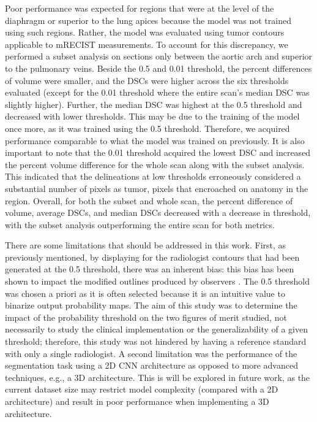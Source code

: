 \documentclass{article}
\begin{document}
Poor performance was expected for regions that were at the level of the diaphragm or superior to the lung apices because the model was not trained using such regions. Rather, the model was evaluated using tumor contours applicable to mRECIST measurements. To account for this discrepancy, we performed a subset analysis on sections only between the aortic arch and superior to the pulmonary veins. Beside the 0.5 and 0.01 threshold, the percent differences of volume were smaller, and the DSCs were higher across the six thresholds evaluated (except for the 0.01 threshold where the entire scan’s median DSC was slightly higher). Further, the median DSC was highest at the 0.5 threshold and decreased with lower thresholds. This may be due to the training of the model once more, as it was trained using the 0.5 threshold. Therefore, we acquired performance comparable to what the model was trained on previously. It is also important to note that the 0.01 threshold acquired the lowest DSC and increased the percent volume difference for the whole scan along with the subset analysis. This indicated that the delineations at low thresholds erroneously considered a substantial number of pixels as tumor, pixels that encroached on anatomy in the region. Overall, for both the subset and whole scan, the percent difference of volume, average DSCs, and median DSCs decreased with a decrease in threshold, with the subset analysis outperforming the entire scan for both metrics. 

There are some limitations that should be addressed in this work. First, as previously mentioned, by displaying for the radiologist contours that had been generated at the 0.5 threshold, there was an inherent bias: this bias has been shown to impact the modified outlines produced by observers \cite{Sensakovic}. The 0.5 threshold was chosen a priori as it is often selected because it is an intuitive value to binarize output probability maps. The aim of this study was to determine the impact of the probability threshold on the two figures of merit studied, not necessarily to study the clinical implementation or the generalizability of a given threshold; therefore, this study was not hindered by having a reference standard with only a single radiologist. A second limitation was the performance of the segmentation task using a 2D CNN architecture as opposed to more advanced techniques, e.g., a 3D architecture. This is will be explored in future work, as the current dataset size may restrict model complexity (compared with a 2D architecture) and result in poor performance when implementing a 3D architecture.
\end{document}

